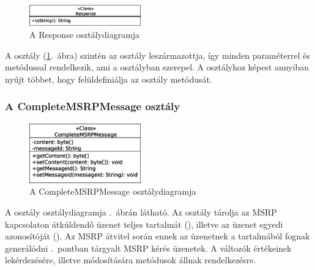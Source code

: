 \begin{figure}
  \vspace{-15pt}
  \begin{center}
    \includegraphics[width=0.43\textwidth]{img/class_diagrams/Response.eps}
  \end{center}
  \vspace{-15pt}
  \captionsetup{font=scriptsize}
  \caption{A Response osztálydiagramja}
   \label{fig:class_response}
  \vspace{-10pt}
\end{figure}
A  osztály (\ref{fig:class_response}.~ábra) szintén az  osztály leszármazottja, így minden paraméterrel és metódussal rendelkezik, ami a  osztályban szerepel. A  osztályhoz képest annyiban nyújt többet, hogy felüldefiniálja az osztály  metódusát.

\newpage
\subsubsection*{A CompleteMSRPMessage osztály}
\label{sec:msrp_completmsrpemessage}

\begin{figure}
  \vspace{-15pt}
  \begin{center}
    \includegraphics[width=0.43\textwidth]{img/class_diagrams/CompleteMSRPMessage.eps}
  \end{center}
  \vspace{-15pt}
  \captionsetup{font=scriptsize}
  \caption{A CompleteMSRPMessage osztálydiagramja}
   \label{fig:class_completmsrpemessage}
  \vspace{-10pt}
\end{figure}
A  osztály osztálydiagramja .~ábrán látható. Az osztály tárolja az MSRP kapcsolaton átküldendő üzenet teljes tartalmát (), illetve az üzenet egyedi azonosítóját (). Az MSRP átvitel során ennek az üzenetnek a tartalmából fognak generálódni .~pontban tárgyalt MSRP kérés üzenetek. A változók értékeinek lekérdezésére, illetve módosítására metódusok állnak rendelkezésre.

